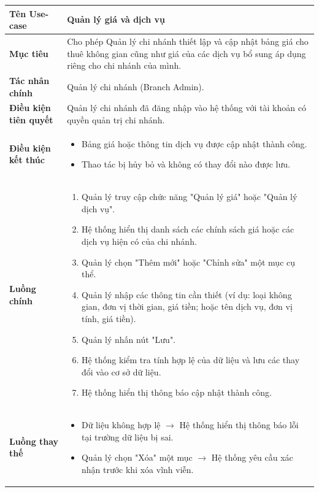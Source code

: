 \begin{table}[H]
\centering
\renewcommand{\arraystretch}{1.3}
\begin{tabular}{|p{4cm}|p{10cm}|}
\hline
\textbf{Tên Use-case} 
& Quản lý giá và dịch vụ \\ 
\hline

\textbf{Mục tiêu} 
& Cho phép Quản lý chi nhánh thiết lập và cập nhật bảng giá cho thuê không gian cũng như giá của các dịch vụ bổ sung áp dụng riêng cho chi nhánh của mình. \\ 
\hline

\textbf{Tác nhân chính} 
& Quản lý chi nhánh (Branch Admin). \\ 
\hline

\textbf{Điều kiện tiên quyết} 
& Quản lý chi nhánh đã đăng nhập vào hệ thống với tài khoản có quyền quản trị chi nhánh. \\ 
\hline

\textbf{Điều kiện kết thúc} 
& 
\begin{itemize}
\item Bảng giá hoặc thông tin dịch vụ được cập nhật thành công.
\item Thao tác bị hủy bỏ và không có thay đổi nào được lưu.
\end{itemize} \\ 
\hline

\textbf{Luồng chính} 
& 
\begin{enumerate}
    \item Quản lý truy cập chức năng "Quản lý giá" hoặc "Quản lý dịch vụ".
    \item Hệ thống hiển thị danh sách các chính sách giá hoặc các dịch vụ hiện có của chi nhánh.
    \item Quản lý chọn "Thêm mới" hoặc "Chỉnh sửa" một mục cụ thể.
    \item Quản lý nhập các thông tin cần thiết (ví dụ: loại không gian, đơn vị thời gian, giá tiền; hoặc tên dịch vụ, đơn vị tính, giá tiền).
    \item Quản lý nhấn nút "Lưu".
    \item Hệ thống kiểm tra tính hợp lệ của dữ liệu và lưu các thay đổi vào cơ sở dữ liệu.
    \item Hệ thống hiển thị thông báo cập nhật thành công.
\end{enumerate} \\ 
\hline

\textbf{Luồng thay thế} 
& 
\begin{itemize}
    \item Dữ liệu không hợp lệ $\rightarrow$ Hệ thống hiển thị thông báo lỗi tại trường dữ liệu bị sai.
    \item Quản lý chọn "Xóa" một mục $\rightarrow$ Hệ thống yêu cầu xác nhận trước khi xóa vĩnh viễn.
\end{itemize} \\ 
\hline


\end{tabular}
\end{table}
